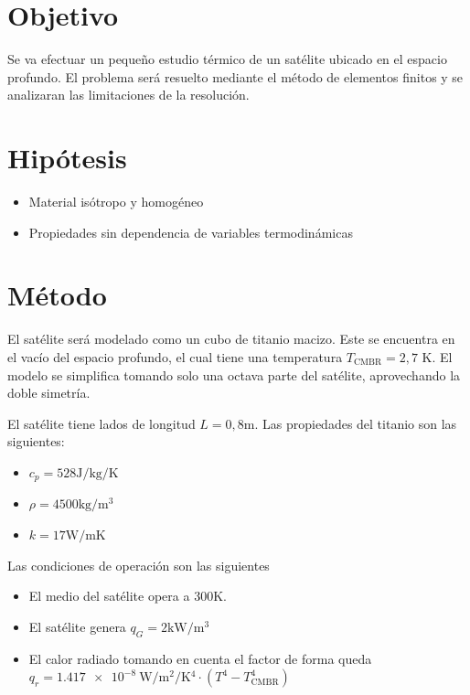 \documentclass[onecolumn,10pt,titlepage,a4paper]{article}
\begin{document}


\section*{Objetivo}
Se va efectuar un pequeño estudio térmico de un satélite ubicado en el espacio profundo. El problema será resuelto mediante el método de elementos finitos y se analizaran las limitaciones de la resolución.

\section*{Hipótesis}
\begin{itemize}
	\item Material isótropo y homogéneo
	\item Propiedades sin dependencia de variables termodinámicas
\end{itemize}


\section*{Método}

El satélite será modelado como un cubo de titanio macizo. Este se encuentra en el vacío del espacio profundo, el cual tiene una temperatura $T_{\mathrm{CMBR}}=2,7$ K. El modelo se simplifica tomando solo una octava parte del satélite, aprovechando la doble simetría. 

El satélite tiene lados de longitud $L=0,8$m. Las propiedades del titanio son las siguientes:
\begin{itemize}
	\item $c_p = 528 \si{\joule \per \kilogram \per \kelvin}$
	\item $\rho = 4500\si{\kilogram \per \meter \cubed }$
	\item $k = 17 \si{\watt \per \meter \kelvin}$
\end{itemize}

Las condiciones de operación son las siguientes
\begin{itemize}
	\item El medio del satélite opera a 300K.
	\item El satélite genera $q_{G}=2\si{\kilo \watt \per \meter \cubed}$
	\item El calor radiado tomando en cuenta el factor de forma queda $q_{r}=\SI{1,417e-8}{\watt \per \meter \squared \per \kelvin^4} \cdot \left( T^4 - T^4_{\mathrm{CMBR}} \right)$
\end{itemize}
\end{document}
